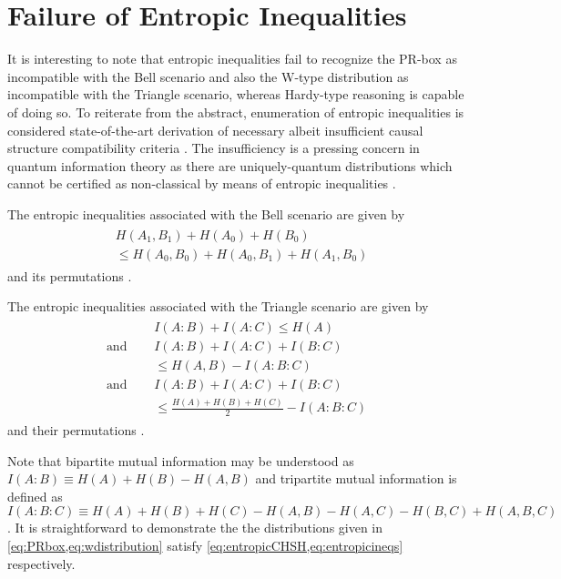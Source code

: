 \section{Failure of Entropic Inequalities}

It is interesting to note that entropic inequalities \cite{fritz2013marginal,chaves2014novel} fail to recognize the PR-box as incompatible with the Bell scenario and also the W-type distribution as incompatible with the Triangle scenario, whereas Hardy-type reasoning is capable of doing so. To reiterate from the abstract, enumeration of entropic inequalities is considered state-of-the-art derivation of necessary albeit insufficient causal structure compatibility criteria \cite{pusey2014gdag}. The insufficiency is a pressing concern in quantum information theory as there are uniquely-quantum distributions which cannot be certified as non-classical by means of entropic inequalities \cite{fritz2012bell}. 

The entropic inequalities associated with the Bell scenario are given by
\begin{align}\begin{split}\label{eq:entropicCHSH}
&H\!\left(A_1,B_1\right)+H\!\left(A_0\right)+H\!\left(B_0\right)
\\&\leq H\!\left(A_0,B_0\right)+H\!\left(A_0,B_1\right)+H\!\left(A_1,B_0\right)
\end{split}\end{align}
and its permutations \cite{chaves2014novel,chaves2012entropic}.

The entropic inequalities associated with the Triangle scenario are given by 
\begin{align}\begin{split}\label{eq:entropicineqs}
&I\!\left(A:B\right)+I\!\left(A:C\right)\leq H\!\left(A\right) \\
\text{and }\quad&I\!\left(A:B\right)+I\!\left(A:C\right)+I\!\left(B:C\right)\\
& \leq H\!\left(A,B\right)-I\!\left(A:B:C\right)\\
\text{and }\quad & I\!\left(A:B\right)+I\!\left(A:C\right)+I\!\left(B:C\right)
\\& \leq\frac{H\!\left(A\right)+H\!\left(B\right)+H\!\left(C\right)}{2}-I\!\left(A:B:C\right)
\end{split}\end{align}
and their permutations \cite{chaves2014novel,Chaves2015infoquantum,pusey2014gdag}.

Note that bipartite mutual information may be understood as $I\!\left(A:B\right)\equiv H\!\left(A\right)+H\!\left(B\right)-H\!\left(A,B\right)$ and tripartite mutual information is defined as $I\!\left(A:B:C\right)\equiv H\!\left(A\right)+H\!\left(B\right)+H\!\left(C\right)-H\!\left(A,B\right)-H\!\left(A,C\right)-H\!\left(B,C\right)+H\!\left(A,B,C\right)$. It is straightforward to demonstrate the the distributions given in \cref{eq:PRbox,eq:wdistribution} satisfy  \cref{eq:entropicCHSH,eq:entropicineqs} respectively.



